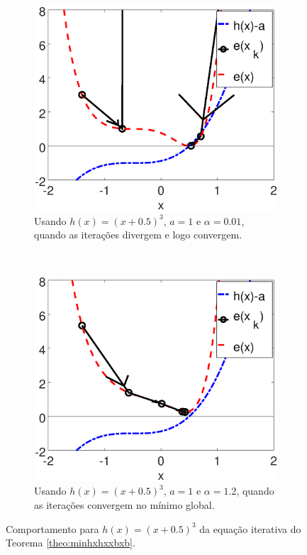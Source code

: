 \begin{figure}[!h]
    \centering
    \begin{subfigure}[b]{0.49\textwidth}
        \includegraphics[width=\textwidth]{chapters/minimization-hx/mfiles/hx3_a_alphax/minimizando_hx_a_alphax_1.eps}
        \caption{Usando $h(x)=(x+0.5)^3$, $a=1$ e $\alpha=0.01$, quando as iterações divergem e logo convergem.}
        \label{fig:hx3bcasesa}
    \end{subfigure}
    ~ %
    \begin{subfigure}[b]{0.49\textwidth}
        \includegraphics[width=\textwidth]{chapters/minimization-hx/mfiles/hx3_a_alphax/minimizando_hx_a_alphax_2.eps}
        \caption{Usando $h(x)=(x+0.5)^3$, $a=1$ e $\alpha=1.2$, quando as iterações convergem no mínimo global.}
        \label{fig:hx3bcasesb}
    \end{subfigure}
    \caption{Comportamento para $h(x)=(x+0.5)^3$ da equação iterativa do Teorema \ref{theo:minhxhxxbxb}.}
    \label{fig:hx3bcases}
\end{figure}

